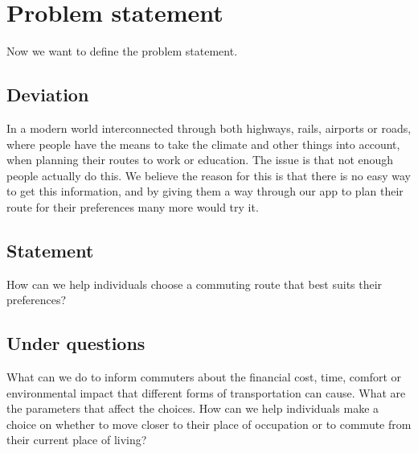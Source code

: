 \chapter{Problem statement}\label{ch:problem-statement}

Now we want to define the problem statement.


\section{Deviation}\label{sec:deviation}

In a modern world interconnected through both highways, rails, airports or roads, where people have the means to take
the climate and other things into account, when planning their routes to work or education.
The issue is that not enough people actually do this.
We believe the reason for this is that there is no easy way to get this information, and by giving them a way through
our app to plan their route for their preferences many more would try it.


\section{Statement}\label{sec:statement}

How can we help individuals choose a commuting route that best suits their preferences?


\section{Under questions}\label{sec:under-questions}

What can we do to inform commuters about the financial cost, time, comfort or environmental impact that different forms
of transportation can cause.
What are the parameters that affect the choices.
How can we help individuals make a choice on whether to move closer to their place of occupation or to commute from
their current place of living?
